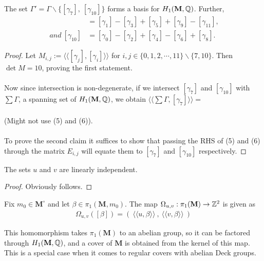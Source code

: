 \documentclass[a4paper, 11pt]{article}
\def\bM{\mathbf{M}}
\def\bMs{\mathbf{M}^\circ}
\def\<{\langle} \def\>{\rangle}
\begin{document}
\begin{cor}
The set $\Gamma'=\Gamma\backslash\{[\gamma_7],~[\gamma_{10}] \}$ forms a basis for $H_1(\bM,\QQ)$. Further,
\begin{align}
[\gamma_7]&=[\gamma_1]-[\gamma_3]+[\gamma_5]+[\gamma_9]-[\gamma_{11}],\\~and~
[\gamma_{10}]&=[\gamma_0]-[\gamma_2]+[\gamma_4]-[\gamma_6]+[\gamma_8].
\end{align}
\begin{proof}
Let $M_{i,j}:=\<\<[\gamma_j],[\gamma_i]\>\>$ for $i,j\in \{0,1,2,\cdots,11 \}\backslash\{7,10\}$. Then $\det M=10$, proving the first statement. \\\\Now since intersection is  non-degenerate, if we intersect $[\gamma_7]$ and $[\gamma_{10}]$ with $\sum\Gamma$, a spanning set of $H_1(\bM,\QQ)$, we obtain $\<\<\sum\Gamma,[\gamma_7]\>\>=$\\\\
(Might not use (5) and (6)).\\\\
To prove the second claim it suffices to show that passing the RHS of (5) and (6) through the matrix $E_{i,j}$ will equate them to $[\gamma_7]$ and $[\gamma_{10}]$ respectively.
\end{proof}
\end{cor}

\begin{cor}
The sets $u$ and $v$ are linearly independent.
\begin{proof}
Obviously follows.
\end{proof}
\end{cor}

\begin{Def}
Fix $m_0\in\bMs$ and let $\beta\in\pi_1(\bM,m_0)$. The map $\Omega_{u,v}:\pi_1(\bM)\rightarrow \ZZ^2$ is given as
\begin{align*}
\Omega_{u,v}([\beta])=(~\<\<u,\beta\>\>~,~\<\<v,\beta\>\>~)
\end{align*}
\end{Def}

This homomorphism takes $\pi_1(\bM)$ to an abelian group, so it can be factored through $H_1(\bM,\QQ)$, and a cover of $\bM$ is obtained from the kernel of this map. This is a special case when it comes to regular covers with abelian Deck groups.
\end{document}
